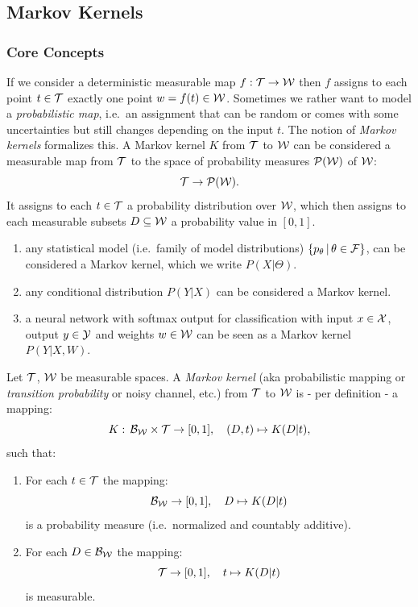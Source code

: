 \subsection{Markov Kernels}

\subsubsection{Core Concepts}

\begin{Motivation}
 If we consider a deterministic measurable map $f: \mathcal{T} \to \mathcal{W}$ then $f$ assigns to each point $t \in \mathcal{T}$ exactly one point $w=f(t) \in \mathcal{W}$.
 Sometimes we rather want to model a \emph{probabilistic map}, i.e.\ an assignment that can be random or comes with some uncertainties but still changes depending on the input $t$. 
 The notion of \emph{Markov kernels} formalizes this. 
A Markov kernel $K$ from $\mathcal{T}$ to $\mathcal{W}$
can be considered  a measurable map from $\mathcal{T}$ to the space of probability measures $\mathcal{P}(\mathcal{W})$ of $\mathcal{W}$:
    \[ \mathcal{T} \to \mathcal{P}(\mathcal{W}).\]
 It assigns to each $t \in \mathcal{T}$ a probability distribution over $\mathcal{W}$, which then assigns to 
    each measurable subsets $D \subseteq \mathcal{W}$ a probability value in $[0,1]$.
\end{Motivation}

\begin{Eg}
    \begin{enumerate}
        \item any statistical model (i.e.\ family of model distributions) $\{p_\theta \,|\, \theta \in \mathcal{F}\}$, can 
            be considered a Markov kernel, which we write $P(X|\Theta)$.
        \item any conditional distribution $P(Y|X)$ can be considered a Markov kernel.
        \item a neural network with softmax output for classification with 
            input $x \in \mathcal{X}$, output $y \in \mathcal{Y}$ and weights $w \in \mathcal{W}$ can be seen as a Markov kernel $P(Y|X,W)$.

    \end{enumerate}
\end{Eg}

\begin{Def}
    \label{def-markov-kernel}
    Let $\mathcal{T}$, $\mathcal{W}$ be measurable spaces.
    A \emph{Markov kernel} (aka probabilistic mapping or \emph{transition probability} or noisy channel, etc.) from $\mathcal{T}$ to $\mathcal{W}$
    is - per definition - a mapping:
    \[ K:\, \mathcal{B}_{\mathcal{W}} \times \mathcal{T} \to [0,1],\quad (D,t) \mapsto K(D|t),\]
    such that:
    \begin{enumerate}[label=\roman*)]
        \item For each $t \in \mathcal{T}$ the mapping:
            \[ \mathcal{B}_{\mathcal{W}} \to [0,1],\quad D \mapsto K(D|t)\]
            is a probability measure (i.e.\ normalized and countably additive).
        \item For each $D \in \mathcal{B}_{\mathcal{W}}$ the mapping:
            \[ \mathcal{T} \to [0,1],\quad t \mapsto K(D|t) \]
            is measurable.
    \end{enumerate}
\end{Def}

